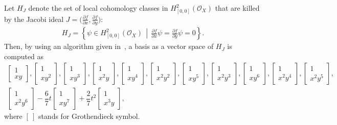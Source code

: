 \documentclass[pdftex]{sigma}%
\numberwithin{equation}{section}
\begin{document}
\begin{Example}
Let $H_J $ denote the set of local cohomology classes in $ H_{[0,0]}^{2}({\mathcal O}_{X}) $ that are killed by the Jacobi ideal $J=\big (\frac{\partial f}{\partial x}, \frac{\partial f}{\partial y}\big)$:
\begin{gather*}
H_J = \left\{ \psi \in H_{[0,0]}^{2}({\mathcal O}_{X})\, \middle| \,\frac{\partial f}{\partial x}\psi = \frac{\partial f}{\partial y}\psi = 0 \right\}.
\end{gather*}
Then, by using an algorithm given in~\cite{NT17a,TNN}, a basis as a vector space of $H_J$ is computed as
\begin{gather*}
\begin{bmatrix} 1 \\ x y \end{bmatrix},
\begin{bmatrix} 1 \\ x y^2 \end{bmatrix},
\begin{bmatrix} 1 \\ x y^3 \end{bmatrix},
\begin{bmatrix} 1 \\ x^2 y \end{bmatrix},
\begin{bmatrix} 1 \\ x y^4 \end{bmatrix},
\begin{bmatrix} 1 \\ x^2 y^2 \end{bmatrix},
\begin{bmatrix} 1 \\ x y^5 \end{bmatrix},
\begin{bmatrix} 1 \\ x^2 y^3 \end{bmatrix},
\begin{bmatrix} 1 \\ x y^6 \end{bmatrix},
\begin{bmatrix} 1 \\ x ^2 y^4 \end{bmatrix},
\begin{bmatrix} 1 \\ x^2 y^5 \end{bmatrix},
\\
\begin{bmatrix} 1 \\ x^2 y^6 \end{bmatrix} -\dfrac{6}{7}t
\begin{bmatrix} 1 \\ x y^7 \end{bmatrix}+\dfrac{2}{7}t^2
\begin{bmatrix} 1 \\ x^3 y \end{bmatrix},
\end{gather*}
where $[\ ] $ stands for Grothendieck symbol.


\end{Example}
\end{document}
